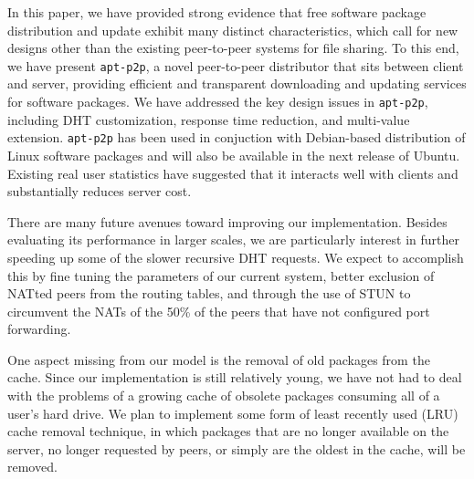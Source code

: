 \documentclass[conference]{IEEEtran}
\begin{document}
In this paper, we have provided strong evidence that free software package distribution
and update exhibit many distinct characteristics, which call for new designs other
than the existing peer-to-peer systems for file sharing. To this end, we have
present \texttt{apt-p2p}, a novel peer-to-peer distributor that sits between
client and server, providing efficient and transparent downloading and updating services
for software packages. We have addressed the key design issues in \texttt{apt-p2p}, including DHT customization,
response time reduction, and multi-value extension. \texttt{apt-p2p}  has been used in conjuction with Debian-based distribution of Linux
software packages and will also be available in the next release of Ubuntu. Existing real user statistics
have suggested that it interacts well with clients and substantially reduces server cost.

There are many future avenues toward improving our implementation. Besides
evaluating its performance in larger scales, we are particularly interest in further speeding up some of the slower recursive
DHT requests. We expect to accomplish this by fine tuning the
parameters of our current system, better exclusion of NATted peers
from the routing tables, and through the use of STUN \cite{STUN} to
circumvent the NATs of the 50\% of the peers that have not
configured port forwarding.

One aspect missing from our model is the removal of old packages
from the cache. Since our implementation is still relatively young,
we have not had to deal with the problems of a growing cache of
obsolete packages consuming all of a user's hard drive. We plan to
implement some form of least recently used (LRU) cache removal
technique, in which packages that are no longer available on the
server, no longer requested by peers, or simply are the oldest in
the cache, will be removed.





\end{document}
